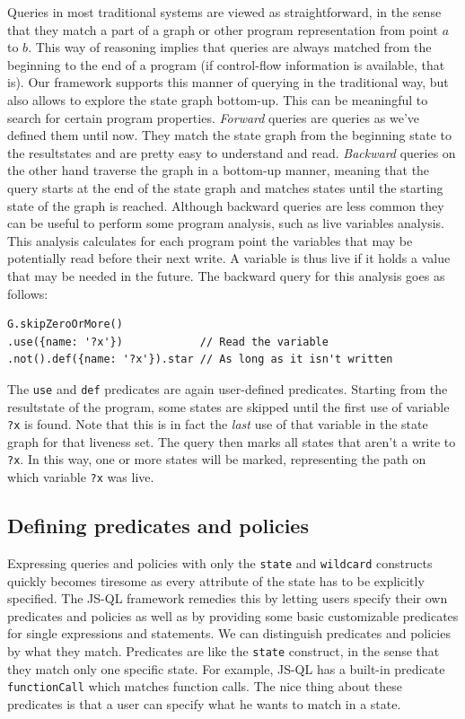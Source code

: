 Queries in most traditional systems are viewed as straightforward, in the sense that they match a part of a graph or other program representation from point $a$ to $b$. This way of reasoning implies that queries are always matched from the beginning to the end of a program (if control-flow information is available, that is). Our framework supports this manner of querying in the traditional way, but also allows to explore the state graph bottom-up. This can be meaningful to search for certain program properties. \textit{Forward} queries are queries as we've defined them until now. They match the state graph from the beginning state to the resultstates and are pretty easy to understand and read. \textit{Backward} queries on the other hand traverse the graph in a bottom-up manner, meaning that the query starts at the end of the state graph and matches states until the starting state of the graph is reached. Although backward queries are less common they can be useful to perform some program analysis, such as live variables analysis. This analysis calculates for each program point the variables that may be potentially read before their next write. A variable is thus live if it holds a value that may be needed in the future. The backward query for this analysis goes as follows:

\begin{lstlisting}[label={lst:Liveness},language=JSQL, caption=Live variables anlysis in JS-QL,mathescape=true]
G.skipZeroOrMore()
.use({name: '?x'})            // Read the variable 
.not().def({name: '?x'}).star // As long as it isn't written
\end{lstlisting}

The \texttt{use} and \texttt{def} predicates are again user-defined predicates. Starting from the resultstate of the program, some states are skipped until the first use of variable \texttt{?x} is found. Note that this is in fact the \textit{last} use of that variable in the state graph for that liveness set. The query then marks all states that aren't a write to \texttt{?x}. In this way, one or more states will be marked, representing the path on which variable \texttt{?x} was live.

\subsection{Defining predicates and policies}
\label{subsec:DefiningPolicies}

Expressing queries and policies with only the \texttt{state} and \texttt{wildcard} constructs quickly becomes tiresome as every attribute of the state has to be explicitly specified. The JS-QL framework remedies this by letting users specify their own predicates and policies as well as by providing some basic customizable predicates for single expressions and statements.
We can distinguish predicates and policies by what they match. Predicates are like the \texttt{state} construct, in the sense that they match only one specific state. For example, JS-QL has a built-in predicate \texttt{functionCall} which matches function calls. The nice thing about these predicates is that a user can specify what he wants to match in a state. 

